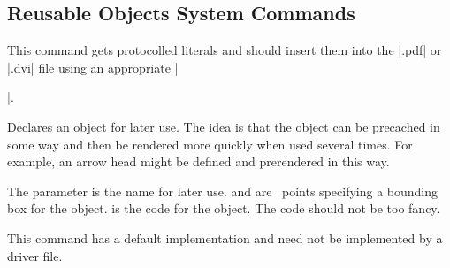 \begin{command}{\pgfsys@rdf@inlist}
\end{command}

\begin{command}{\pgfsys@rdf@prefix{}}
\end{command}

\begin{command}{\pgfsys@rdf@property{}}
\end{command}

\begin{command}{\pgfsys@rdf@rel{}}
\end{command}

\begin{command}{\pgfsys@rdf@resource{}}
\end{command}

\begin{command}{\pgfsys@rdf@rev{}}
\end{command}

\begin{command}{\pgfsys@rdf@src{}}
\end{command}

\begin{command}{\pgfsys@rdf@typeof{}}
\end{command}

\begin{command}{\pgfsys@rdf@vocab{}}
\end{command}


\subsection{Reusable Objects System Commands}

\begin{command}{\pgfsys@invoke{}}
    This command gets protocolled literals and should insert them into the
    |.pdf| or |.dvi| file using an appropriate |\special|.
\end{command}

\begin{command}{\pgfsys@defobject{}}
    Declares an object for later use. The idea is that the object can be
    precached in some way and then be rendered more quickly when used several
    times. For example, an arrow head might be defined and prerendered in this
    way.

    The parameter  is the name for later use.  and
     are \pgfname\ points specifying a bounding box for the
    object.  is the code for the object. The code should not be too
    fancy.

    This command has a default implementation and need not be implemented by a
    driver file.
\end{command}

